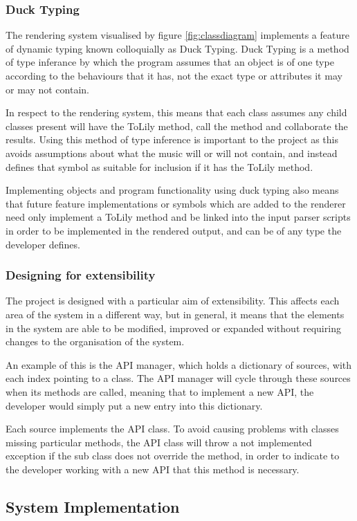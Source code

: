 \subsubsection{Duck Typing}
The rendering system visualised by figure \ref{fig:classdiagram} implements a feature of dynamic typing known colloquially as Duck Typing. Duck Typing is a method of type inferance by which the program assumes that an object is of one type according to the behaviours that it has, not the exact type or attributes it may or may not contain. %

In respect to the rendering system, this means that each class assumes any child classes present will have the ToLily method, call the method and collaborate the results. Using this method of type inference is important to the project as this avoids assumptions about what the music will or will not contain, and instead defines that symbol as suitable for inclusion if it has the ToLily method. 

Implementing objects and program functionality using duck typing also means that future feature implementations or symbols which are added to the renderer need only implement a ToLily method and be linked into the input parser scripts in order to be implemented in the rendered output, and can be of any type the developer defines.

\subsubsection{Designing for extensibility}
The project is designed with a particular aim of extensibility. This affects each area of the system in a different way, but in general, it means that the elements in the system are able to be modified, improved or expanded without requiring changes to the organisation of the system. 

An example of this is the API manager, which holds a dictionary of sources, with each index pointing to a class. The API manager will cycle through these sources when its methods are called, meaning that to implement a new API, the developer would simply put a new entry into this dictionary.

Each source implements the API class. To avoid causing problems with classes missing particular methods, the API class will throw a not implemented exception if the sub class does not override the method, in order to indicate to the developer working with a new API that this method is necessary.


\subsection{System Implementation}
